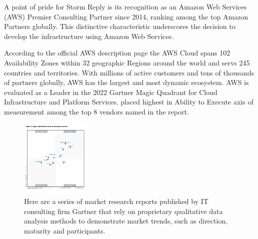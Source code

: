 A point of pride for Storm Reply is its recognition as an Amazon Web Services (AWS) Premier Consulting Partner since 2014, ranking among the top Amazon Partners globally. This distinctive characteristic underscores the decision to develop the infrastructure using Amazon Web Services.

According to the official AWS description page \cite{AWSGlobalInfrastructure} the AWS Cloud spans 102 Availability Zones within 32 geographic Regions around the world and servs 245 countries and territories. With millions of active customers and tens of thousands of partners globally, AWS has the largest and most dynamic ecosystem. AWS is evaluated as a Leader in the 2022 Gartner Magic Quadrant for Cloud Infrastructure and Platform Services, placed highest in Ability to Execute axis of measurement among the top 8 vendors named in the report.

\begin{figure}[h]  %
  \centering
  \includegraphics[width=0.3\textwidth]{images/AWSMagicQuadrantForCloud.png}  %
  \caption{Here are a series of market research reports published by IT consulting firm Gartner that rely on proprietary qualitative data analysis methods to demonstrate market trends, such as direction, maturity and participants. \cite{GartnerMagicQuadrant}}
  \label{fig:AWSMagicQuadrantForCloud}
\end{figure}

